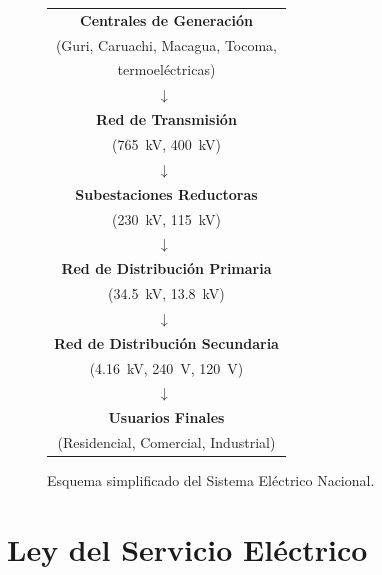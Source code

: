\documentclass[12pt,a4paper]{article}
\begin{document}
\begin{figure}[H]
    \centering
    \begin{minipage}{0.9\textwidth}
    \centering
    \vspace{2em}
    \noindent
    \begin{tabular}{|c|}
        \hline
        \textbf{Centrales de Generación} \\
        (Guri, Caruachi, Macagua, Tocoma, \\
        termoeléctricas) \\
        \hline
        \ $\downarrow$ \ \\
        \hline
        \textbf{Red de Transmisión} \\
        (\SI{765}{\kilo\volt}, \SI{400}{\kilo\volt}) \\
        \hline
        \ $\downarrow$ \ \\
        \hline
        \textbf{Subestaciones Reductoras} \\
        (\SI{230}{\kilo\volt}, \SI{115}{\kilo\volt}) \\
        \hline
        \ $\downarrow$ \ \\
        \hline
        \textbf{Red de Distribución Primaria} \\
        (\SI{34.5}{\kilo\volt}, \SI{13.8}{\kilo\volt}) \\
        \hline
        \ $\downarrow$ \ \\
        \hline
        \textbf{Red de Distribución Secundaria} \\
        (\SI{4.16}{\kilo\volt}, \SI{240}{\volt}, \SI{120}{\volt}) \\
        \hline
        \ $\downarrow$ \ \\
        \hline
        \textbf{Usuarios Finales} \\
        (Residencial, Comercial, Industrial) \\
        \hline
    \end{tabular}
    \end{minipage}
    \caption{Esquema simplificado del Sistema Eléctrico Nacional.}
\end{figure}

\section{Ley del Servicio Eléctrico}
\end{document}
